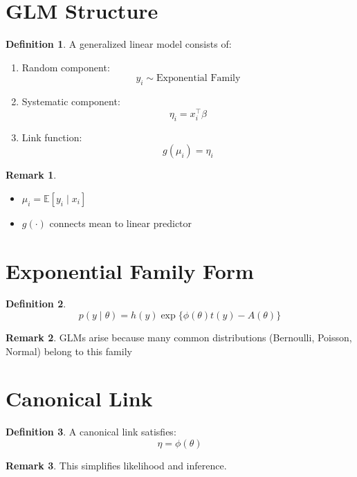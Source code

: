 \documentclass[12pt,oneside]{book}
\numberwithin{equation}{section}
\theoremstyle{definition}
\newtheorem{definition}{Definition}[section]
\newtheorem{remark}{Remark}[section]
\theoremstyle{plain}
\theoremstyle{remark}
\begin{document}
\section{GLM Structure}

\begin{definition}
A generalized linear model consists of:

\begin{enumerate}
\item Random component:
$$
y_i \sim \text{Exponential Family}
$$

\item Systematic component:
$$
\eta_i = x_i^\top \beta
$$

\item Link function:
$$
g(\mu_i) = \eta_i
$$
\end{enumerate}
\end{definition}

\begin{remark}
\begin{itemize}
\item $\mu_i = \mathbb{E}[y_i \mid x_i]$
\item $g(\cdot)$ connects mean to linear predictor
\end{itemize}
\end{remark}

\section{Exponential Family Form}

\begin{definition}
$$
p(y \mid \theta)
=
h(y)\exp\{ \phi(\theta)t(y) - A(\theta) \}
$$
\end{definition}

\begin{remark}
GLMs arise because many common distributions (Bernoulli, Poisson, Normal) belong to this family  
\end{remark}

\section{Canonical Link}

\begin{definition}
A canonical link satisfies:
$$
\eta = \phi(\theta)
$$
\end{definition}

\begin{remark}
This simplifies likelihood and inference.
\end{remark}
\end{document}
